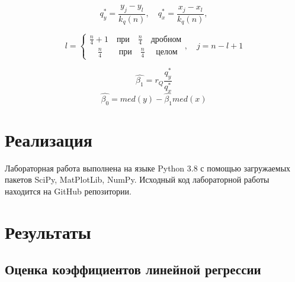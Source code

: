 \documentclass[12pt,a4paper]{article}
\begin{document}
			\begin{equation}
				q_y^*=\frac{y_j-y_l}{k_q(n)}, \quad q_x^*=\frac{x_j-x_l}{k_q(n)},
			\end{equation}
		
			\begin{equation}
				l = 
				\left\{
				\begin{array}{l}
					\frac{n}{4} + 1 \quad \text{при} \quad \frac{n}{4} \quad \text{дробном}\\
					\quad \frac{n}{4} \qquad \text{при} \quad \frac{n}{4} \quad \text{ целом}
				\end{array}
				\right.
				, \quad j = n - l + 1
			\end{equation}

			
			\begin{equation}
				\hat{\beta_1}=r_Q\frac{q_y^*}{q_x^*}
			\end{equation}
			\begin{equation}
				\hat{\beta_0}=med(y)-\hat{\beta_1}med(x)
			\end{equation}
	\newpage
	
	\section{Реализация}
	Лабораторная работа выполнена на языке Python 3.8 с помощью загружаемых пакетов SciPy, MatPlotLib, NumPy. Исходный код лабораторной работы находится на GitHub репозитории.
	\newpage
	
	\section{Результаты}
		\subsection{Оценка коэффициентов линейной регрессии}
\end{document}
